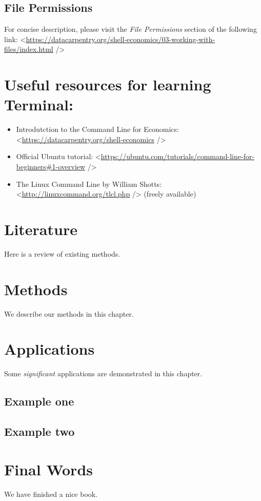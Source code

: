 \documentclass[
]{book}
\providecommand{\tightlist}{%
  \setlength{\itemsep}{0pt}\setlength{\parskip}{0pt}}
\begin{document}
\hypertarget{file-permissions}{%
\section{File Permissions}\label{file-permissions}}

For concise description, please visit the \emph{File Permissions} section of the following link: \textless{}\url{https://datacarpentry.org/shell-economics/03-working-with-files/index.html} /\textgreater{}

\hypertarget{useful-resources-for-learning-terminal}{%
\chapter{Useful resources for learning Terminal:}\label{useful-resources-for-learning-terminal}}

\begin{itemize}
\tightlist
\item
  Introdutction to the Command Line for Economics: \textless{}\url{https://datacarpentry.org/shell-economics} /\textgreater{}
\item
  Official Ubuntu tutorial: \textless{}\url{https://ubuntu.com/tutorials/command-line-for-beginners\#1-overview} /\textgreater{}
\item
  The Linux Command Line by William Shotts: \textless{}\url{http://linuxcommand.org/tlcl.php} /\textgreater{} (freely available)
\end{itemize}

\hypertarget{literature}{%
\chapter{Literature}\label{literature}}

Here is a review of existing methods.

\hypertarget{methods}{%
\chapter{Methods}\label{methods}}

We describe our methods in this chapter.

\hypertarget{applications}{%
\chapter{Applications}\label{applications}}

Some \emph{significant} applications are demonstrated in this chapter.

\hypertarget{example-one}{%
\section{Example one}\label{example-one}}

\hypertarget{example-two}{%
\section{Example two}\label{example-two}}

\hypertarget{final-words}{%
\chapter{Final Words}\label{final-words}}

We have finished a nice book.

  
\end{document}
